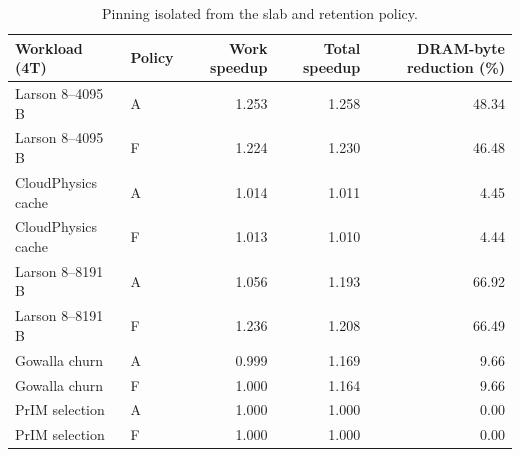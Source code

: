 \begin{table}[t]
\caption{Pinning isolated from the slab and retention policy.}\label{tab:pinning}
\centering\small
\begin{tabular}{llrrr}\toprule
Workload (4T) & Policy & Work speedup & Total speedup & DRAM-byte reduction (\%) \\ \midrule
Larson 8--4095 B & A & 1.253 & 1.258 & 48.34 \\
Larson 8--4095 B & F & 1.224 & 1.230 & 46.48 \\
CloudPhysics cache & A & 1.014 & 1.011 & 4.45 \\
CloudPhysics cache & F & 1.013 & 1.010 & 4.44 \\
Larson 8--8191 B & A & 1.056 & 1.193 & 66.92 \\
Larson 8--8191 B & F & 1.236 & 1.208 & 66.49 \\
Gowalla churn & A & 0.999 & 1.169 & 9.66 \\
Gowalla churn & F & 1.000 & 1.164 & 9.66 \\
PrIM selection & A & 1.000 & 1.000 & 0.00 \\
PrIM selection & F & 1.000 & 1.000 & 0.00 \\
\bottomrule\end{tabular}
\par\vspace{2pt}{\footnotesize The pinned variant uses a measured 540 B additional WRAM endpoint in each pair. It is an added-storage comparison, not an equal-WRAM-budget replacement experiment.}
\end{table}
